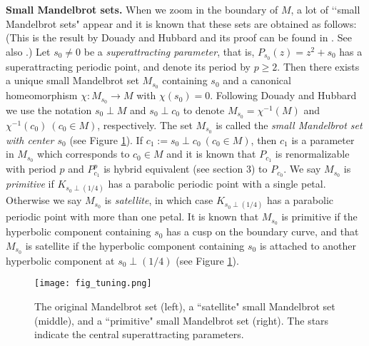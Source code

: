 \noin
{\bf Small Mandelbrot sets.} 
When we zoom in the boundary of $M$, a lot of \lq\lq small Mandelbrot sets" 
appear and it is known that these sets are obtained as follows: (This is 
the result by Douady and Hubbard and its proof can be found in 
\cite[Th\'eor\`eme 1 du Modulation]{Haissinsky 2000}. See also 
\cite{Milnor 2000}.) 
Let $s_0 \ne 0$ be a {\it superattracting parameter}, that is, 
$P_{s_0}(z) = z^2 + s_0$ has a superattracting periodic point, and denote
its period by $p \geq 2$. Then there exists a unique small Mandelbrot set 
$M_{s_0}$ containing $s_0$ and a canonical homeomorphism 
$\chi : M_{s_0} \to M$ with $\chi(s_0) = 0$. Following Douady and Hubbard
we use the notation $s_0 \perp M$ and $s_0 \perp c_0$  to 
denote $M_{s_0} = \chi^{-1}(M)$ and $\chi^{-1}(c_0) \ (c_0 \in M)$, 
respectively. The set $M_{s_0}$ is called the {\it small Mandelbrot set 
with center $s_0$} (see Figure \ref{primitive and satellite small M-set}). 
If $c_1 := s_0 \perp c_0 \ (c_0 \in M)$, then $c_1$ is a parameter in 
$M_{s_0}$ which corresponds to $c_0 \in M$ and it is known that $P_{c_1}$ 
is renormalizable with period $p$ and $P_{c_1}^p$ is hybrid equivalent 
(see section 3) to $P_{c_0}$. 
We say $M_{s_0}$ is {\it primitive} if $K_{s_0 \perp (1/4)}$ has a parabolic
periodic point with a single petal. Otherwise we say $M_{s_0}$ is 
{\it satellite}, in which case $K_{s_0 \perp (1/4)}$ has a parabolic
periodic point with more than one petal. 
It is known that $M_{s_0}$ is primitive if the hyperbolic component
containing $s_0$ has a cusp on the boundary curve, and that $M_{s_0}$
is satellite if the hyperbolic component containing $s_0$ is attached
to another hyperbolic component at $s_0 \perp (1/4)$
(see Figure \ref{primitive and satellite small M-set}).



\begin{figure}[htbp]
\texttt{[image: fig\_tuning.png]}
\caption{\small
The original Mandelbrot set (left), a ``satellite" small Mandelbrot
set (middle),
and a ``primitive" small Mandelbrot set (right).
The stars indicate the central superattracting parameters.
}
\label{primitive and satellite small M-set}
\end{figure}



